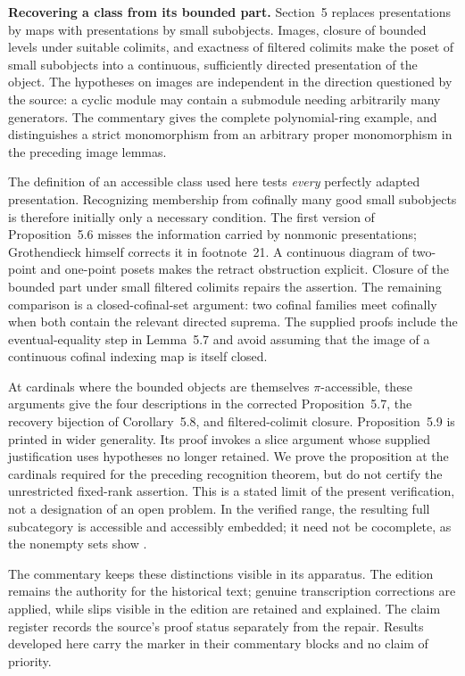 \medskip\noindent\textbf{Recovering a class from its bounded part.}
Section~5 replaces presentations by maps with presentations by small subobjects. Images, closure of bounded levels under suitable colimits, and exactness of filtered colimits make the poset of small subobjects into a continuous, sufficiently directed presentation of the object. The hypotheses on images are independent in the direction questioned by the source: a cyclic module may contain a submodule needing arbitrarily many generators. The commentary gives the complete polynomial-ring example, and distinguishes a strict monomorphism from an arbitrary proper monomorphism in the preceding image lemmas.

The definition of an accessible class used here tests \emph{every} perfectly adapted presentation. Recognizing membership from cofinally many good small subobjects is therefore initially only a necessary condition. The first version of Proposition~5.6 misses the information carried by nonmonic presentations; Grothendieck himself corrects it in footnote~21. A continuous diagram of two-point and one-point posets makes the retract obstruction explicit. Closure of the bounded part under small filtered colimits repairs the assertion. The remaining comparison is a closed-cofinal-set argument: two cofinal families meet cofinally when both contain the relevant directed suprema. The supplied proofs include the eventual-equality step in Lemma~5.7 and avoid assuming that the image of a continuous cofinal indexing map is itself closed.

At cardinals where the bounded objects are themselves $\pi$-accessible, these arguments give the four descriptions in the corrected Proposition~5.7, the recovery bijection of Corollary~5.8, and filtered-colimit closure. Proposition~5.9 is printed in wider generality. Its proof invokes a slice argument whose supplied justification uses hypotheses no longer retained. We prove the proposition at the cardinals required for the preceding recognition theorem, but do not certify the unrestricted fixed-rank assertion. This is a stated limit of the present verification, not a designation of an open problem. In the verified range, the resulting full subcategory is accessible and accessibly embedded; it need not be cocomplete, as the nonempty sets show \citep[Definition~2.1]{AdamekRosicky1994}.

The commentary keeps these distinctions visible in its apparatus. The edition remains the authority for the historical text; genuine transcription corrections are applied, while slips visible in the edition are retained and explained. The claim register records the source's proof status separately from the repair. Results developed here carry the marker \ours{} in their commentary blocks and no claim of priority.
